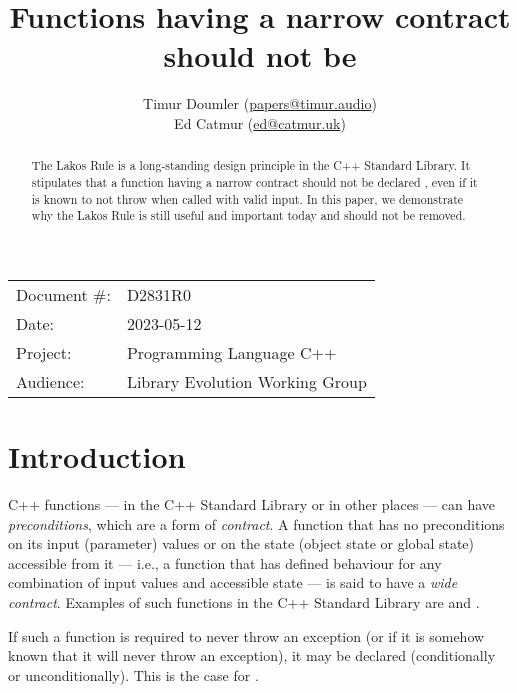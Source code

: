 


\title{Functions having a narrow contract should not be }
\author{ Timur Doumler \small(\href{mailto:papers@timur.audio}{papers@timur.audio})   \\
Ed Catmur \small(\href{mailto:ed@catmur.uk}{ed@catmur.uk})  }
\date{}
\maketitle

\begin{tabular}{ll}
Document \#: & D2831R0 \\
Date: &2023-05-12 \\
Project: & Programming Language C++ \\
Audience: & Library Evolution Working Group
\end{tabular}

\begin{abstract}
The Lakos Rule is a long-standing design principle in the C++ Standard Library. It stipulates that a function having a narrow contract should not be declared , even if it is known to not throw when called with valid input. In this paper, we demonstrate why the Lakos Rule is still useful and important today and should not be removed.
\end{abstract}

\section{Introduction}
\label{sec:intro}

C++ functions --- in the C++ Standard Library or in other places --- can have \emph{preconditions}, which are a form of \emph{contract}. A function that has no preconditions on its input (parameter) values or on the state (object state or global state) accessible from it --- i.e., a function that has defined behaviour for any combination of input values and accessible state --- is said to have a \emph{wide contract}. Examples of such functions in the C++ Standard Library are  and .

If such a function is required to never throw an exception (or if it is somehow known that it will never throw an exception), it may be declared  (conditionally or unconditionally). This is the case for .

